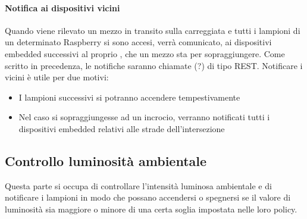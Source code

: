 \paragraph{Notifica ai dispositivi vicini}
Quando viene rilevato un mezzo in transito sulla carreggiata e tutti i lampioni di un determinato Raspberry si sono accesi, verrà comunicato, ai dispositivi embedded successivi al proprio , che un mezzo sta per sopraggiungere.
Come scritto in precedenza, le notifiche saranno chiamate (?) di tipo REST.
Notificare i vicini è utile per due motivi:
\begin{itemize}
	\item I lampioni successivi si potranno accendere tempestivamente
	\item Nel caso si sopraggiungesse ad un incrocio, verranno notificati tutti i dispositivi embedded relativi alle strade dell'intersezione
\end{itemize}
\subsection{Controllo luminosità ambientale}
Questa parte si occupa di controllare l'intensità luminosa ambientale e di notificare i lampioni in modo che possano accendersi o spegnersi se il valore di luminosità sia maggiore o minore di una certa soglia impostata nelle loro policy.
